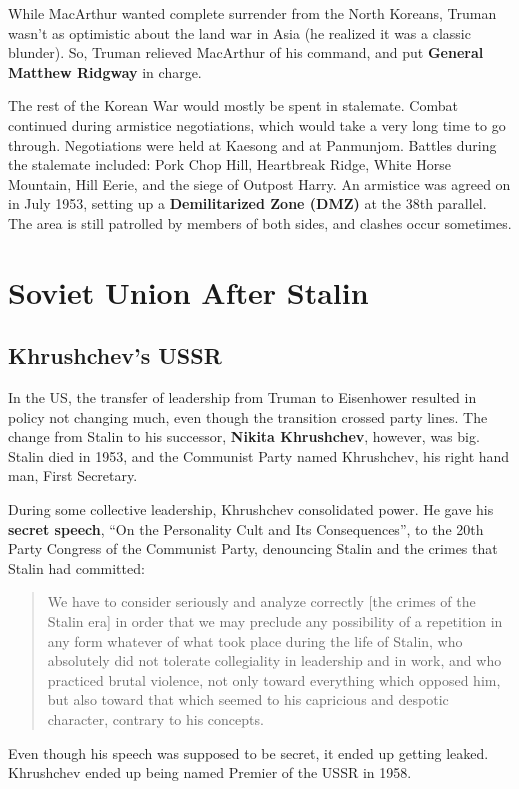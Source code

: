 While MacArthur wanted complete surrender from the North Koreans,
Truman wasn't as optimistic about the land war in Asia (he realized it was a classic blunder).
So, Truman relieved MacArthur of his command, and put \textbf{General Matthew Ridgway} in charge.

The rest of the Korean War would mostly be spent in stalemate.
Combat continued during armistice negotiations, which would take a very long time to go through.
Negotiations were held at Kaesong and at Panmunjom.
Battles during the stalemate included:
Pork Chop Hill,
Heartbreak Ridge,
White Horse Mountain,
Hill Eerie,
and the siege of Outpost Harry.
An armistice was agreed on in July 1953, setting up a \textbf{Demilitarized Zone (DMZ)} at the 38th parallel.
The area is still patrolled by members of both sides, and clashes occur sometimes.


\section{Soviet Union After Stalin}

\subsection*{Khrushchev's USSR}

In the US, the transfer of leadership from Truman to Eisenhower resulted in policy not changing much,
even though the transition crossed party lines.
The change from Stalin to his successor, \textbf{Nikita Khrushchev}, however, was big.
Stalin died in 1953, and the Communist Party named Khrushchev, his right hand man, First Secretary.

During some collective leadership, Khrushchev consolidated power.
He gave his \textbf{secret speech}, ``On the Personality Cult and Its Consequences'',
to the 20th Party Congress of the Communist Party,
denouncing Stalin and the crimes that Stalin had committed:
\begin{quote}
  We have to consider seriously and analyze correctly [the crimes of the Stalin era]
  in order that we may preclude any possibility of a repetition in any form whatever
  of what took place during the life of Stalin,
  who absolutely did not tolerate collegiality in leadership and in work,
  and who practiced brutal violence, not only toward everything which opposed him,
  but also toward that which seemed to his capricious and despotic character, contrary to his concepts.
\end{quote}
Even though his speech was supposed to be secret, it ended up getting leaked.
Khrushchev ended up being named Premier of the USSR in 1958.

